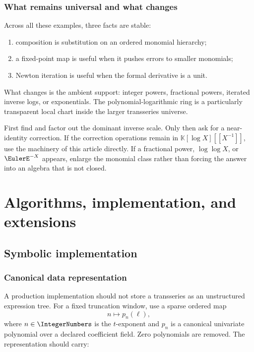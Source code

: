 \documentclass[11pt,oneside,openany]{book}
\newcommand{\K}{\mathbb{K}}
\begin{document}
\section{What remains universal and what changes}
Across all these examples, three facts are stable:
\begin{enumerate}
\item composition is substitution on an ordered monomial hierarchy;
\item a fixed-point map is useful when it pushes errors to smaller monomials;
\item Newton iteration is useful when the formal derivative is a unit.
\end{enumerate}
What changes is the ambient support: integer powers, fractional powers,
iterated inverse logs, or exponentials.  The polynomial-logarithmic ring is a
particularly transparent local chart inside the larger transseries universe.

\begin{summarybox}
First find and factor out the dominant inverse scale.  Only then ask for a
near-identity correction.  If the correction operations remain in
\(\K[\log X][[X^{-1}]]\), use the machinery of this article directly.  If a
fractional power, \(\log\log X\), or \(\EulerE^{-X}\) appears, enlarge the monomial
class rather than forcing the answer into an algebra that is not closed.
\end{summarybox}


\part{Algorithms, implementation, and extensions}

\chapter{Symbolic implementation}
\label{ch:implementation}

\section{Canonical data representation}
A production implementation should not store a transseries as an unstructured
expression tree.  For a fixed truncation window, use a sparse ordered map
\begin{equation}\label{eq:datastructure}
 n\longmapsto p_n(\ell),
\end{equation}
where \(n\in\IntegerNumbers\) is the \(t\)-exponent and \(p_n\) is a canonical
univariate polynomial over a declared coefficient field.  Zero polynomials are
removed.  The representation should carry:
\end{document}

